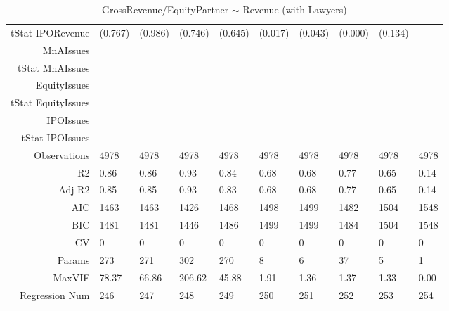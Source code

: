\begin{table}[ht]
\begin{tabular}{rlllllllll}
  tStat IPORevenue & (0.767) & (0.986) & (0.746) & (0.645) & (0.017) & (0.043) & (0.000) & (0.134) &  \\ 
  MnAIssues &  &  &  &  &  &  &  &  &  \\ 
  tStat MnAIssues &  &  &  &  &  &  &  &  &  \\ 
  EquityIssues &  &  &  &  &  &  &  &  &  \\ 
  tStat EquityIssues &  &  &  &  &  &  &  &  &  \\ 
  IPOIssues &  &  &  &  &  &  &  &  &  \\ 
  tStat IPOIssues &  &  &  &  &  &  &  &  &  \\ 
  Observations & 4978 & 4978 & 4978 & 4978 & 4978 & 4978 & 4978 & 4978 & 4978 \\ 
  R2 & 0.86 & 0.86 & 0.93 & 0.84 & 0.68 & 0.68 & 0.77 & 0.65 & 0.14 \\ 
  Adj R2 & 0.85 & 0.85 & 0.93 & 0.83 & 0.68 & 0.68 & 0.77 & 0.65 & 0.14 \\ 
  AIC & 1463 & 1463 & 1426 & 1468 & 1498 & 1499 & 1482 & 1504 & 1548 \\ 
  BIC & 1481 & 1481 & 1446 & 1486 & 1499 & 1499 & 1484 & 1504 & 1548 \\ 
  CV & 0 & 0 & 0 & 0 & 0 & 0 & 0 & 0 & 0 \\ 
  Params & 273 & 271 & 302 & 270 & 8 & 6 & 37 & 5 & 1 \\ 
  MaxVIF & 78.37 & 66.86 & 206.62 & 45.88 & 1.91 & 1.36 & 1.37 & 1.33 & 0.00 \\ 
  Regression Num & 246 & 247 & 248 & 249 & 250 & 251 & 252 & 253 & 254 \\ 
   \hline
\end{tabular}
\caption{GrossRevenue/EquityPartner $\sim$ Revenue (with Lawyers)} 
\end{table}
